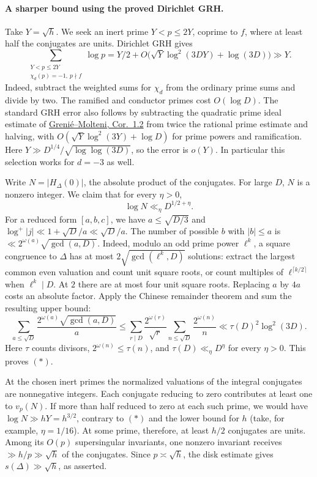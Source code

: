 \paragraph{A sharper bound using the proved Dirichlet GRH.}
Take $Y=\sqrt h$. We seek an inert prime $Y<p\le 2Y$, coprime to $f$,
where at least half the conjugates are units. Dirichlet GRH gives
\[
 \sum_{\substack{Y<p\le 2Y\\\chi_d(p)=-1,\ p\nmid f}}\log p
  = Y/2+O\big(\sqrt Y\log^2(3DY)+\log(3D)\big)\gg Y.
\]
Indeed, subtract the weighted sums for $\chi_d$ from the ordinary prime
sums and divide by two. The ramified and conductor primes cost $O(\log D)$.
The standard GRH error also follows by subtracting the quadratic prime
ideal estimate of
\href{https://arxiv.org/abs/1312.4463}{Greni\'e--Molteni, Cor.~1.2}
from twice the rational prime estimate and halving, with
$O(\sqrt{Y}\log^2(3Y)+\log D)$ for prime powers and ramification.
Here $Y\gg D^{1/4}/\sqrt{\log\log(3D)}$, so the error is $o(Y)$.
In particular this selection works for $d=-3$ as well.

Write $N=|H_\Delta(0)|$, the absolute product of the conjugates.
For large $D$, $N$ is a nonzero integer. We claim that for every $\eta>0$,
\[
                         \log N\ll_\eta D^{1/2+\eta}.             \tag{*}
\]
For a reduced form $[a,b,c]$, we have $a\le\sqrt{D/3}$ and
$\log^+ |j|\ll1+\sqrt D/a\ll\sqrt D/a$. The number of possible
$b$ with $|b|\le a$ is $\ll 2^{\omega(a)}\sqrt{\gcd(a,D)}$.
Indeed, modulo an odd prime power $\ell^k$, a square congruence to $\Delta$
has at most $2\sqrt{\gcd(\ell^k,D)}$ solutions: extract the largest common
even valuation and count unit square roots, or count multiples of
$\ell^{\lceil k/2\rceil}$ when $\ell^k\mid D$. At $2$ there are at most
four unit square roots. Replacing $a$ by $4a$ costs an absolute factor.
Apply the Chinese remainder theorem and sum the resulting upper bound:
\[
 \sum_{a\le\sqrt D}\frac{2^{\omega(a)}\sqrt{\gcd(a,D)}}a
 \le \sum_{r\mid D}\frac{2^{\omega(r)}}{\sqrt r}
            \sum_{n\le\sqrt D}\frac{2^{\omega(n)}}n
 \ll \tau(D)^2\log^2(3D).
\]
Here $\tau$ counts divisors, $2^{\omega(n)}\le\tau(n)$, and
$\tau(D)\ll_\eta D^\eta$ for every $\eta>0$. This proves $(*)$.

At the chosen inert primes the normalized valuations of the integral
conjugates are nonnegative integers. Each conjugate reducing to zero
contributes at least one to $v_p(N)$. If more than half reduced to
zero at each such prime, we would have $\log N\gg hY=h^{3/2}$,
contrary to $(*)$ and the lower bound for $h$ (take, for example,
$\eta=1/16$). At some prime, therefore, at least $h/2$ conjugates
are units. Among its $O(p)$ supersingular invariants, one nonzero
invariant receives $\gg h/p\gg\sqrt h$ of the conjugates. Since
$p\asymp\sqrt h$, the disk estimate gives $s(\Delta)\gg\sqrt h$,
as asserted.
